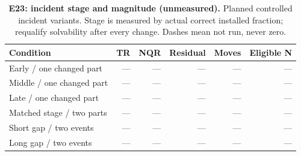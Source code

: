 \begin{table}[!ht]
\centering\small
\caption{\textbf{E23: incident stage and magnitude (unmeasured).} Planned controlled incident variants. Stage is measured by actual correct installed fraction; requalify solvability after every change. Dashes mean not run, never zero.}
\begin{tabularx}{\textwidth}{@{}Xrrrrr@{}}\toprule
Condition & TR & NQR & Residual & Moves & Eligible N\\\midrule
Early / one changed part & --- & --- & --- & --- & ---\\
Middle / one changed part & --- & --- & --- & --- & ---\\
Late / one changed part & --- & --- & --- & --- & ---\\
Matched stage / two parts & --- & --- & --- & --- & ---\\
Short gap / two events & --- & --- & --- & --- & ---\\
Long gap / two events & --- & --- & --- & --- & ---\\
\bottomrule
\end{tabularx}
\end{table}
